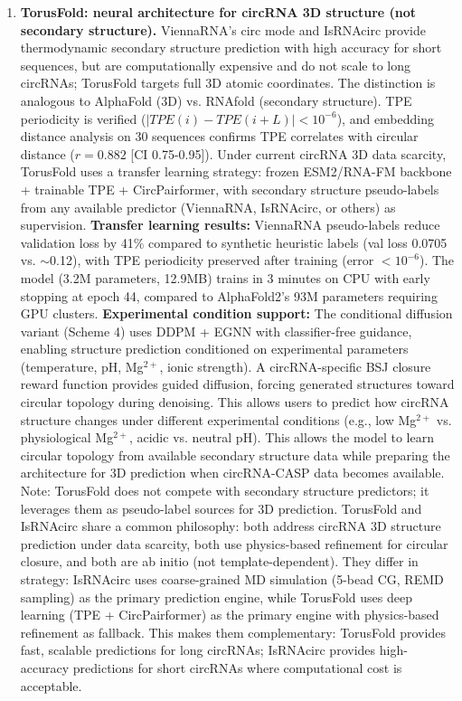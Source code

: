 \documentclass[11pt,a4paper]{article}
\begin{document}
\begin{enumerate}
\item \textbf{TorusFold: neural architecture for circRNA 3D structure (not secondary structure).} ViennaRNA's circ mode and IsRNAcirc provide thermodynamic secondary structure prediction with high accuracy for short sequences, but are computationally expensive and do not scale to long circRNAs; TorusFold targets full 3D atomic coordinates. The distinction is analogous to AlphaFold (3D) vs. RNAfold (secondary structure). TPE periodicity is verified ($|TPE(i) - TPE(i+L)| < 10^{-6}$), and embedding distance analysis on 30 sequences confirms TPE correlates with circular distance ($r=0.882$ [CI 0.75-0.95]). Under current circRNA 3D data scarcity, TorusFold uses a transfer learning strategy: frozen ESM2/RNA-FM backbone + trainable TPE + CircPairformer, with secondary structure pseudo-labels from any available predictor (ViennaRNA, IsRNAcirc, or others) as supervision. \textbf{Transfer learning results:} ViennaRNA pseudo-labels reduce validation loss by 41\% compared to synthetic heuristic labels (val loss 0.0705 vs. $\sim$0.12), with TPE periodicity preserved after training (error $< 10^{-6}$). The model (3.2M parameters, 12.9MB) trains in 3 minutes on CPU with early stopping at epoch 44, compared to AlphaFold2's 93M parameters requiring GPU clusters. \textbf{Experimental condition support:} The conditional diffusion variant (Scheme 4) uses DDPM + EGNN with classifier-free guidance, enabling structure prediction conditioned on experimental parameters (temperature, pH, Mg$^{2+}$, ionic strength). A circRNA-specific BSJ closure reward function provides guided diffusion, forcing generated structures toward circular topology during denoising. This allows users to predict how circRNA structure changes under different experimental conditions (e.g., low Mg$^{2+}$ vs. physiological Mg$^{2+}$, acidic vs. neutral pH). This allows the model to learn circular topology from available secondary structure data while preparing the architecture for 3D prediction when circRNA-CASP data becomes available. Note: TorusFold does not compete with secondary structure predictors; it leverages them as pseudo-label sources for 3D prediction. TorusFold and IsRNAcirc \citep{jiang2024isrnacirc} share a common philosophy: both address circRNA 3D structure prediction under data scarcity, both use physics-based refinement for circular closure, and both are ab initio (not template-dependent). They differ in strategy: IsRNAcirc uses coarse-grained MD simulation (5-bead CG, REMD sampling) as the primary prediction engine, while TorusFold uses deep learning (TPE + CircPairformer) as the primary engine with physics-based refinement as fallback. This makes them complementary: TorusFold provides fast, scalable predictions for long circRNAs; IsRNAcirc provides high-accuracy predictions for short circRNAs where computational cost is acceptable.


\end{enumerate}
\end{document}

